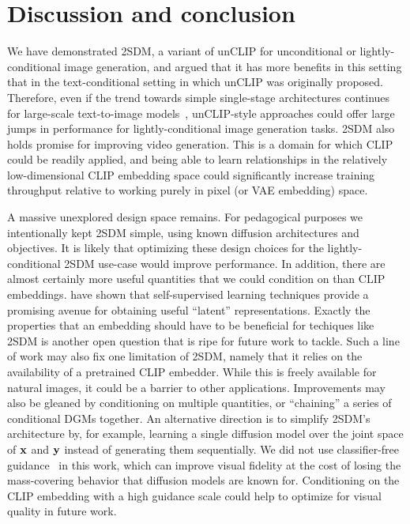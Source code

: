 \section{Discussion and conclusion}
We have demonstrated 2SDM, a variant of unCLIP for unconditional or lightly-conditional image generation, and argued that it has more benefits in this setting that in the text-conditional setting in which unCLIP was originally proposed. Therefore, even if the trend towards simple single-stage architectures continues for large-scale text-to-image models~\citep{rombach2022high,chang2023muse,hoogeboom2023simple}, unCLIP-style approaches could offer large jumps in performance for lightly-conditional image generation tasks.
%
2SDM also holds promise for improving video generation. This is a domain for which CLIP could be readily applied, and being able to learn relationships in the relatively low-dimensional CLIP embedding space could significantly increase training throughput relative to working purely in pixel (or VAE embedding) space.

A massive unexplored design space remains. For pedagogical purposes we intentionally kept 2SDM simple, using known diffusion architectures and objectives. It is likely that optimizing these design choices for the lightly-conditional 2SDM use-case would improve performance. In addition, there are almost certainly more useful quantities that we could condition on than CLIP embeddings. 
\citet{bao2022conditional,hu2022self} have shown that self-supervised learning techniques provide a promising avenue for obtaining useful ``latent'' representations. Exactly the properties that an embedding should have to be beneficial for techiques like 2SDM is another open question that is ripe for future work to tackle. Such a line of work may also fix one limitation of 2SDM, namely that it relies on the availability of a pretrained CLIP embedder. While this is freely available for natural images, it could be a barrier to other applications. Improvements may also be gleaned by conditioning on multiple quantities, or ``chaining'' a series of conditional DGMs together. An alternative direction is to simplify 2SDM's architecture by, for example, learning a single diffusion model over the joint space of ${\mathbf{x}}$ and ${\mathbf{y}}$ instead of generating them sequentially. 
%
We did not use classifier-free guidance~\citep{ho2022classifier} in this work, which can improve visual fidelity at the cost of losing the mass-covering behavior that diffusion models are known for. Conditioning on the CLIP embedding with a high guidance scale could help to optimize for visual quality in future work.
%


